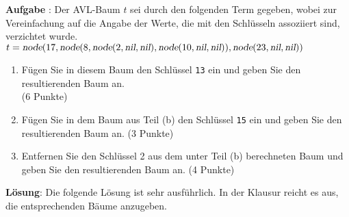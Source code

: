 \documentclass{article}
\newcounter{aufgabe}
\newcommand{\exercise}{\vspace*{0.2cm}
\stepcounter{aufgabe}

\noindent
\textbf{Aufgabe \arabic{aufgabe}}: }
\newcommand{\solution}{\vspace*{0.2cm}

\noindent
\textbf{L\"osung}: }
\begin{document}
\exercise
 Der AVL-Baum $t$ sei durch den folgenden Term gegeben,
wobei zur Vereinfachung auf die Angabe der Werte, die mit den Schl\"usseln
assoziiert sind, verzichtet wurde.
\\[0.2cm]
\hspace*{1.3cm}
$t = \textsl{node}(17, 
           \textsl{node}(8, 
               \textsl{node}(2, \textsl{nil}, \textsl{nil}),
               \textsl{node}(10, \textsl{nil}, \textsl{nil})), 
           \textsl{node}(23,\textsl{nil},\textsl{nil}))$
\begin{enumerate}
\item F\"ugen Sie  in diesem Baum den Schl\"ussel \texttt{13} ein und geben Sie den
      resultierenden Baum an.   \\[0.2cm]
      \hspace*{\fill} (6 Punkte)
\item F\"ugen Sie in dem Baum aus Teil (b) den Schl\"ussel \texttt{15} ein und geben Sie den
      resultierenden Baum an.
      \hspace*{\fill} (3 Punkte)
\item Entfernen Sie den Schl\"ussel 2 aus dem unter Teil (b) berechneten Baum und geben Sie
      den resultierenden Baum an.
      \hspace*{\fill} (4 Punkte)
\end{enumerate}

\solution
Die folgende L\"osung ist sehr ausf\"uhrlich.  In der Klausur reicht es aus, die entsprechenden B\"aume anzugeben. 
\end{document}
